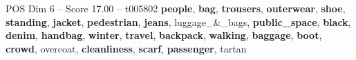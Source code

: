\begin{textsample}{POS Dim 6 – Score 17.00 – t005802}  \label{ex:f6_pos_013}
\textbf{people}, \textbf{bag}, \textbf{trousers}, \textbf{outerwear}, \textbf{shoe}, \textbf{standing}, \textbf{jacket}, \textbf{pedestrian}, \textbf{jeans}, luggage\_\&\_bags, \textbf{public\_space}, \textbf{black}, \textbf{denim}, \textbf{handbag}, \textbf{winter}, \textbf{travel}, \textbf{backpack}, \textbf{walking}, \textbf{baggage}, \textbf{boot}, \textbf{crowd}, overcoat, \textbf{cleanliness}, \textbf{scarf}, \textbf{passenger}, tartan

\end{textsample}
